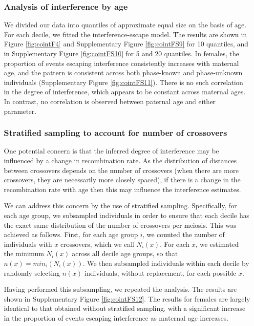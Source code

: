 \subsubsection{Analysis of interference by age} %
 
We divided our data into quantiles of approximate equal size on the basis of age.
For each decile, we fitted the interference-escape model. The results are shown in Figure \ref{fig:cointF4}
and Supplementary Figure \ref{fig:cointFS9} for 10 quantiles, and in Supplementary Figure \ref{fig:cointFS10}
for 5 and 20 quantiles. In females, the proportion of events escaping interference consistently 
increases with maternal age, and the pattern is consistent across both phase-known and phase-unknown 
individuals (Supplementary Figure \ref{fig:cointFS11}). There is no such correlation in the degree 
of interference, which appears to be constant across maternal ages. In contrast, no correlation is 
observed between paternal age and either parameter.  

\subsubsection{Stratified sampling to account for number of crossovers} %
 
One potential concern is that the inferred degree of interference may be influenced 
by a change in recombination rate. As the distribution of distances between crossovers 
depends on the number of crossovers (when there are more crossovers, they are necessarily more 
closely spaced), if there is a change in the recombination rate with age then this may influence 
the interference estimates.  

We can address this concern by the use of stratified sampling. Specifically, for each age group, 
we subsampled individuals in order to ensure that each decile has the exact same distribution 
of the number of crossovers per meiosis. This was achieved as follows. First, for each age group 
$i$, we counted the number of individuals with $x$ crossovers, which we call $N_i(x)$. For each $x$,
we estimated the minimum $N_i(x)$ across all decile age groups, so that $n(x) = min_i (N_i(x))$.
We then subsampled individuals within each decile by randomly selecting $n(x)$ individuals, 
without replacement, for each possible $x$. 

Having performed this subsampling, we repeated the analysis. The results are shown in 
Supplementary Figure \ref{fig:cointFS12}. The results for females are largely identical to that
obtained without stratified sampling, with a significant increase in the proportion of events 
escaping interference as maternal age increases.  


